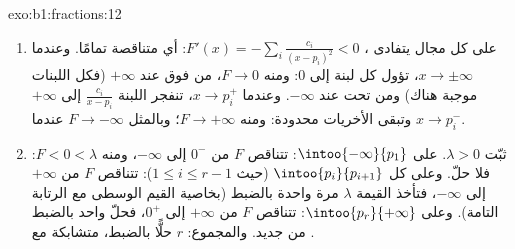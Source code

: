 \begin{solution}{exo:b1:fractions:12}
\begin{enumerate}
  \item على كل مجال يتفادى ، $F'(x) = -\sum_i
        \frac{c_i}{(x - p_i)^2} < 0$: أي متناقصة تمامًا. وعندما $x
        \to \pm\infty$، تؤول كل لبنة إلى $0$: ومنه $F \to 0$، من
        فوق عند $+\infty$ (فكل اللبنات موجبة هناك) ومن
        تحت عند $-\infty$. وعندما $x \to p_i^+$، تنفجر اللبنة
        $\frac{c_i}{x - p_i}$ إلى $+\infty$ وتبقى الأخريات
        محدودة: ومنه $F \to +\infty$؛ وبالمثل $F \to -\infty$ عندما
        $x \to p_i^-$.
  \item ثبّت $\lambda > 0$. على $\intoo{-\infty}{p_1}$: تتناقص $F$
        من $0^-$ إلى $-\infty$، ومنه $F < 0 < \lambda$:
        فلا حلّ. وعلى كل $\intoo{p_i}{p_{i+1}}$ (حيث $1 \leq i
        \leq r-1$): تتناقص $F$ من $+\infty$ إلى $-\infty$،
        فتأخذ القيمة $\lambda$ مرة واحدة بالضبط (بخاصية القيم
        الوسطى مع الرتابة التامة). وعلى
        $\intoo{p_r}{+\infty}$: تتناقص $F$ من $+\infty$ إلى
        $0^+$، فحلّ واحد بالضبط من جديد. والمجموع: $r$
        حلًّا بالضبط، متشابكة مع .
\end{enumerate}
\end{solution}

